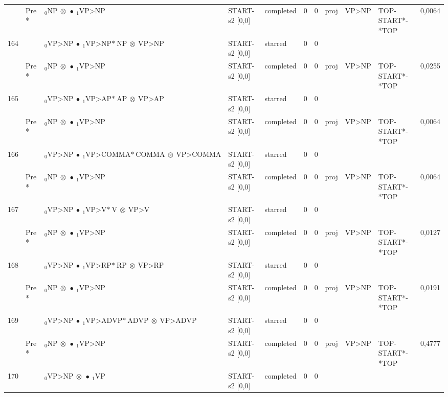 \documentclass[10pt]{article}
\begin{document}
\begin{longtable}[htbp]{lllllllllll}
 & Pre *& $ {}_0 \textrm{NP} \  \otimes \  \bullet \ {}_{1} \textrm{VP>NP} $ & START-s2 [0,0] & completed & 0 & 0 & proj & VP>NP & TOP-START*-*TOP & 0,0064 \\ 
164 & & $ {}_0 \textrm{VP>NP} \  \bullet \ {}_{1} \textrm{VP>NP*} \ \textrm{NP} \  \otimes \ \textrm{VP>NP} $ & START-s2 [0,0] & starred & 0 & 0 & & & & \\ 
 & Pre *& $ {}_0 \textrm{NP} \  \otimes \  \bullet \ {}_{1} \textrm{VP>NP} $ & START-s2 [0,0] & completed & 0 & 0 & proj & VP>NP & TOP-START*-*TOP & 0,0255 \\ 
165 & & $ {}_0 \textrm{VP>NP} \  \bullet \ {}_{1} \textrm{VP>AP*} \ \textrm{AP} \  \otimes \ \textrm{VP>AP} $ & START-s2 [0,0] & starred & 0 & 0 & & & & \\ 
 & Pre *& $ {}_0 \textrm{NP} \  \otimes \  \bullet \ {}_{1} \textrm{VP>NP} $ & START-s2 [0,0] & completed & 0 & 0 & proj & VP>NP & TOP-START*-*TOP & 0,0064 \\ 
166 & & $ {}_0 \textrm{VP>NP} \  \bullet \ {}_{1} \textrm{VP>COMMA*} \ \textrm{COMMA} \  \otimes \ \textrm{VP>COMMA} $ & START-s2 [0,0] & starred & 0 & 0 & & & & \\ 
 & Pre *& $ {}_0 \textrm{NP} \  \otimes \  \bullet \ {}_{1} \textrm{VP>NP} $ & START-s2 [0,0] & completed & 0 & 0 & proj & VP>NP & TOP-START*-*TOP & 0,0064 \\ 
167 & & $ {}_0 \textrm{VP>NP} \  \bullet \ {}_{1} \textrm{VP>V*} \ \textrm{V} \  \otimes \ \textrm{VP>V} $ & START-s2 [0,0] & starred & 0 & 0 & & & & \\ 
 & Pre *& $ {}_0 \textrm{NP} \  \otimes \  \bullet \ {}_{1} \textrm{VP>NP} $ & START-s2 [0,0] & completed & 0 & 0 & proj & VP>NP & TOP-START*-*TOP & 0,0127 \\ 
168 & & $ {}_0 \textrm{VP>NP} \  \bullet \ {}_{1} \textrm{VP>RP*} \ \textrm{RP} \  \otimes \ \textrm{VP>RP} $ & START-s2 [0,0] & starred & 0 & 0 & & & & \\ 
 & Pre *& $ {}_0 \textrm{NP} \  \otimes \  \bullet \ {}_{1} \textrm{VP>NP} $ & START-s2 [0,0] & completed & 0 & 0 & proj & VP>NP & TOP-START*-*TOP & 0,0191 \\ 
169 & & $ {}_0 \textrm{VP>NP} \  \bullet \ {}_{1} \textrm{VP>ADVP*} \ \textrm{ADVP} \  \otimes \ \textrm{VP>ADVP} $ & START-s2 [0,0] & starred & 0 & 0 & & & & \\ 
 & Pre *& $ {}_0 \textrm{NP} \  \otimes \  \bullet \ {}_{1} \textrm{VP>NP} $ & START-s2 [0,0] & completed & 0 & 0 & proj & VP>NP & TOP-START*-*TOP & 0,4777 \\ 
170 & & $ {}_0 \textrm{VP>NP} \  \otimes \  \bullet \ {}_{1} \textrm{VP} $ & START-s2 [0,0] & completed & 0 & 0 & & & & \\ 

\end{longtable}
\end{document}
